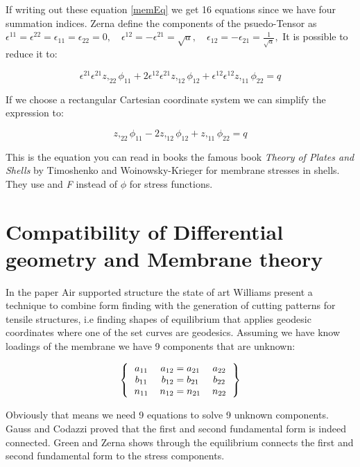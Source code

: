 If writing out these equation \ref{memEq} we get 16 equations since we have four summation indices. Zerna define the components of the  psuedo-Tensor as $\epsilon^{11} = \epsilon^{22}=\epsilon_{11}=\epsilon_{22} = 0,\quad \epsilon^{12} = -\epsilon^{21} = \sqrt{a},\quad \epsilon_{12} = -\epsilon_{21} = \frac{1}{\sqrt{a}},$ It is possible to reduce it to:

\begin{equation}
    \epsilon^{21}\epsilon^{21}z,_{22}\phi_{11} + 2\epsilon^{12}\epsilon^{21}z,_{12}\phi_{12} + \epsilon^{12}\epsilon^{12}z,_{11}\phi_{22} = q
\end{equation}

If we choose a rectangular Cartesian coordinate system we can simplify the expression to:

\begin{equation}
    z,_{22}\phi_{11} -2 z,_{12}\phi_{12} + z,_{11}\phi_{22} = q
\end{equation}

This is the equation you can read in books the famous book \textit{Theory of Plates and Shells} by Timoshenko and Woinowsky-Krieger for membrane stresses in shells. They use and \textit{F} instead of $\phi$ for stress functions.



\section{Compatibility of Differential geometry and Membrane theory}

In the paper Air supported structure the state of art Williams present a technique to combine form finding with the generation of cutting patterns for tensile structures, i.e finding shapes of equilibrium that applies geodesic coordinates where one of the set curves are geodesics. 
Assuming we have know loadings of the membrane we have 9 components that are unknown:

\[ 
\left \{
  \begin{tabular}{ccc}
  $a_{11}$  & $a_{12} =a_{21} $ & $a_{22}$ \\
 $b_{11}$  & $b_{12} =b_{21} $ & $b_{22}$\\
  $n_{11}$  & $n_{12} =n_{21} $ & $n_{22}$ 
  \end{tabular}
\right \}
\]

\vspace{5mm}
Obviously that means we need 9 equations to solve 9 unknown components. Gauss and Codazzi proved that the first and second fundamental form is indeed connected. Green and Zerna shows through the equilibrium connects the first and second fundamental form to the stress components. 
\vspace{5mm}

